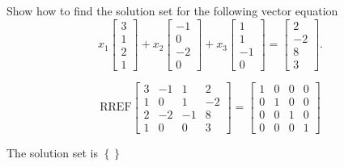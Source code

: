 
\begin{exerciseStatement}


Show how to find the solution set for the following vector equation \[ x_{1} \left[\begin{array}{c}
3 \\
1 \\
2 \\
1
\end{array}\right] + x_{2} \left[\begin{array}{c}
-1 \\
0 \\
-2 \\
0
\end{array}\right] + x_{3} \left[\begin{array}{c}
1 \\
1 \\
-1 \\
0
\end{array}\right] = \left[\begin{array}{c}
2 \\
-2 \\
8 \\
3
\end{array}\right] .\]


\end{exerciseStatement}
    
\begin{exerciseAnswer} 
\[\mathrm{RREF} \left[\begin{array}{ccc|c}
3 & -1 & 1 & 2 \\
1 & 0 & 1 & -2 \\
2 & -2 & -1 & 8 \\
1 & 0 & 0 & 3
\end{array}\right]  =  \left[\begin{array}{ccc|c}
1 & 0 & 0 & 0 \\
0 & 1 & 0 & 0 \\
0 & 0 & 1 & 0 \\
0 & 0 & 0 & 1
\end{array}\right] \]

The solution set is \( \left\{\right\} \)


\end{exerciseAnswer}
    

